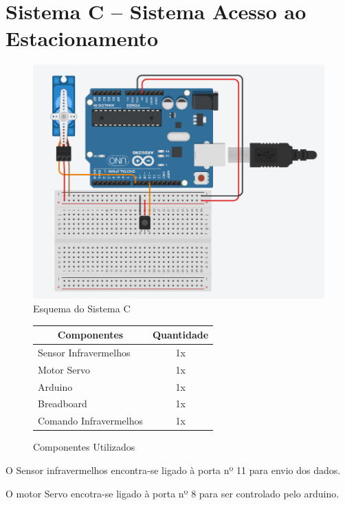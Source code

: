 \section{Sistema C – Sistema Acesso ao Estacionamento}

\begin{figure}[H]
    \centering
    \includegraphics[scale=0.4]{images/hardware/sisC_tinkercad.png}    
    \caption{Esquema do Sistema C}
\end{figure}

\begin{figure}[H]
\centering
\setlength{\arrayrulewidth}{0.5mm}
\renewcommand{\arraystretch}{1.5}
\begin{tabular}{|l | c|} 
 \hline
 \multicolumn{1}{|c|}{Componentes} & \multicolumn{1}{|c|}{Quantidade}\\ [0.8ex] 
 \hline
 Sensor Infravermelhos & 1x \\ 
 \hline
 Motor Servo & 1x \\
 \hline
 Arduino & 1x \\
 \hline
 Breadboard & 1x\\
 \hline
 Comando Infravermelhos & 1x  \\ 
 \hline
\end{tabular}
\caption{Componentes Utilizados}
\end{figure}


O Sensor infravermelhos encontra-se ligado à porta nº 11 para envio dos dados.

O motor Servo encotra-se ligado à porta nº 8 para ser controlado pelo arduino.




